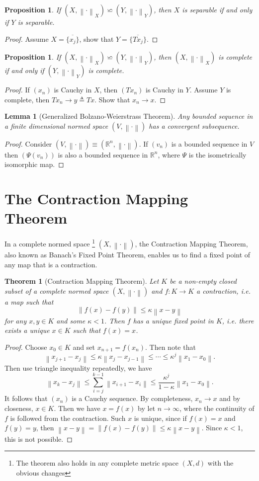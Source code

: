 \documentclass[12pt,a4paper]{report}
\numberwithin{equation}{section}
\theoremstyle{mystyle}
\newtheorem{theorem}[definition]{Theorem}
\newtheorem{lemma}[definition]{Lemma}
\newtheorem{proposition}[definition]{Proposition}
\newcommand{\R}{\mathbb{R}}
\newcommand{\norm}[1]{\left\lVert #1 \right\rVert}
\begin{document}
	\begin{proposition}
		If $(X,\norm{\cdot}_X)\backsimeq (Y,\norm{\cdot}_Y)$, then $X$ is separable if and only if $Y$ is separable.
	\end{proposition}
	\begin{proof}
		Assume $X=\overline{\{x_j\}}$, show that $Y=\overline{\{Tx_j\}}$.
	\end{proof}
	\begin{proposition}
		If $(X,\norm{\cdot}_X)\backsimeq (Y,\norm{\cdot}_Y)$, then $(X,\norm{\cdot}_X)$ is complete if and only if $(Y,\norm{\cdot}_Y)$ is complete.
	\end{proposition}
	\begin{proof}
		If $(x_n)$ is Cauchy in $X$, then $(Tx_n)$ is Cauchy in $Y$. Assume $Y$ is complete, then $Tx_n\to y\triangleq Tx$. Show that $x_n\to x$.
	\end{proof}
	
	\begin{lemma}[Generalized Bolzano-Weierstrass Theorem]
		Any bounded sequence in a finite dimensional normed space $(V,\norm{\cdot})$ has a convergent subsequence.
	\end{lemma}
	\begin{proof}
		Consider $(V,\norm{\cdot})\equiv (\R^n, \norm{\cdot})$. If $(v_n)$ is a bounded sequence in $V$ then $(\Psi(v_n))$ is also a bounded sequence in $\R^n$, where $\Psi$ is the isometrically isomorphic map.
	\end{proof}


	\section{The Contraction Mapping Theorem}
	In a complete normed space
	\footnote{The theorem also holds in any complete metric space $(X,d)$ with the obvious changes}
	$(X,\norm{\cdot})$, the Contraction Mapping Theorem, also known as Banach's Fixed Point Theorem, enables us to find a fixed point of any map that is a contraction.
	\begin{theorem}[Contraction Mapping Theorem]
		Let $K$ be a non-empty closed subset of a complete normed space $(X,\norm{\cdot})$ and $f: K\to K$ a contraction, i.e. a map such that
		$$
		\norm{f(x)-f(y)}\leq \kappa \norm{x-y}
		$$
		for any $x,y\in K$ and some $\kappa<1$. Then $f$ has a unique fixed point in $K$, i.e. there exists a unique $x\in K$ such that $f(x)=x$.
	\end{theorem}
	\begin{proof}
		Choose $x_0\in K$ and set $x_{n+1}=f(x_n)$. Then note that
		$$
		\norm{x_{j+1}-x_j}\leq \kappa \norm{x_j-x_{j-1}}\leq \cdots \leq \kappa^j \norm{x_1-x_0}.
		$$
		Then use triangle inequality repeatedly, we have
		$$
		\norm{x_k-x_j}\leq \sum_{i=j}^{k-1}\norm{x_{i+1}-x_i}\leq \frac{\kappa^j}{1-\kappa}\norm{x_1-x_0}.
		$$
		It follows that $(x_n)$ is a Cauchy sequence. By completeness, $x_n\to x$ and by closeness, $x\in K$. Then we have $x=f(x)$ by let $n\to\infty$, where the continuity of $f$ is followed from the contraction. Such $x$ is unique, since if $f(x)=x$ and $f(y)=y$, then $\norm{x-y}=\norm{f(x)-f(y)}\leq \kappa \norm{x-y}$. Since $\kappa<1$, this is not possible.
	\end{proof}
	
\end{document}
